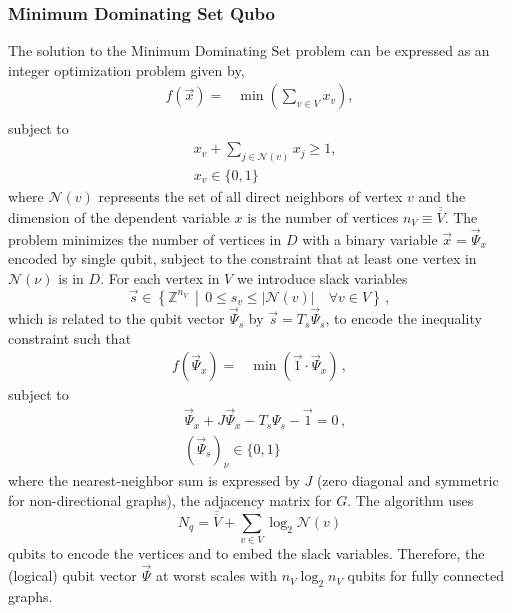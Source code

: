 \documentclass[prd,twocolumn,tightenlines,preprintnumbers,showpacs,superscriptaddress,notitlepage,nofootinbib,eqsecnum,floatfix,longbibliography,aps,10pt]{revtex4-2}
\begin{document}
\subsubsection{Minimum Dominating Set Qubo}
\label{sec:methods:mds-qubo}

The solution to the Minimum Dominating Set problem can be expressed as an integer optimization problem given by,
\begin{align}
 f(\vec x) = & \min\left(\sum_{v \in V} x_v\right),                    \\
\end{align}
subject to
\begin{align}
 & x_v + \sum_{j \in \mathcal{N}(v)} x_j \geq 1, \\
 & x_v \in \{0, 1\}
\end{align}
where $\mathcal{N}(v)$ represents the set of all direct neighbors of vertex $v$ and the dimension of the dependent variable $x$ is the number of vertices $n_V \equiv \overline{\overline{V}}$.
The problem minimizes the number of vertices in $D$ with a binary variable $\vec x = \vec \Psi_x$ encoded by single qubit, subject to the constraint that at least one vertex in $\mathcal{N}(\nu)$ is in $D$.
For each vertex in $V$ we introduce slack variables
\begin{equation}
    \vec s \in \left\{ \mathbb{Z}^{n_V} \, \middle| \, 0 \leq s_{v} \leq |\mathcal{N}(v)| \quad \forall v\in V \right\} \, ,
\end{equation}
which is related to the qubit vector $\vec \Psi_s$ by $\vec s = T_s \vec \Psi_s$, to encode the inequality constraint such that
\begin{align}
 f(\vec \Psi_x)
 =
 & \min\left(\vec 1 \cdot \vec \Psi_x \right) \, ,
\end{align}
subject to
\begin{align}
 &
 \vec \Psi_x + J \vec \Psi_x - T_s \Psi_s  - \vec 1 = 0\,,
 \\
 &
 (\vec \Psi_s)_\nu \in \{ 0, 1\}
\end{align}
where the nearest-neighbor sum is expressed by $J$ (zero diagonal and symmetric for non-directional graphs), the adjacency matrix for $G$.
The algorithm uses
\begin{equation}
    N_q = \overline{\overline{V}} + \sum_{v \in V} \log_2 \mathcal{N}(v)
\end{equation}
qubits to encode the vertices and to embed the slack variables.
Therefore, the (logical) qubit vector $\vec \Psi$ at worst scales with $n_V \log_2 n_V$ qubits for fully connected graphs.
\end{document}
